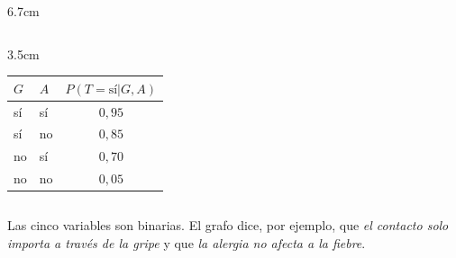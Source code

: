 \documentclass[aspectratio=169, 10pt]{beamer}
\begin{document}
\begin{frame}
\begin{columns}[T]
\begin{column}{6.7cm}
\begin{columns}[T]
\begin{column}{3.5cm}
\vspace{0.5em}
\begin{tabular}{@{}llc@{}}
\toprule
$G$ & $A$ & $P(T{=}\text{sí}|G,A)$\\
\midrule
sí & sí & $0{,}95$\\
sí & no & $0{,}85$\\
no & sí & $0{,}70$\\
no & no & $0{,}05$\\
\bottomrule
\end{tabular}
\end{column}
\end{columns}
\end{column}
\end{columns}
\vspace{0.3em}
\footnotesize Las cinco variables son binarias. El grafo dice, por ejemplo, que \emph{el contacto solo importa a través de la gripe} y que \emph{la alergia no afecta a la fiebre}.
\end{frame}
\end{document}
